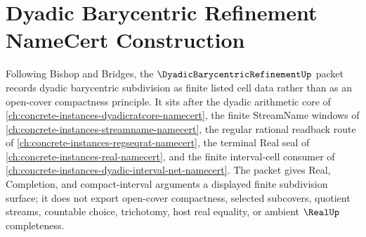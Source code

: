 \chapter{Dyadic Barycentric Refinement NameCert Construction}
\label{ch:concrete-instances-dyadic-barycentric-refinement-namecert}

Following Bishop and Bridges, the $\DyadicBarycentricRefinementUp$ packet records dyadic barycentric subdivision as finite listed cell data rather than as an open-cover compactness principle. It sits after the dyadic arithmetic core of \autoref{ch:concrete-instances-dyadicratcore-namecert}, the finite StreamName windows of \autoref{ch:concrete-instances-streamname-namecert}, the regular rational readback route of \autoref{ch:concrete-instances-regseqrat-namecert}, the terminal Real seal of \autoref{ch:concrete-instances-real-namecert}, and the finite interval-cell consumer of \autoref{ch:concrete-instances-dyadic-interval-net-namecert}. The packet gives Real, Completion, and compact-interval arguments a displayed finite subdivision surface; it does not export open-cover compactness, selected subcovers, quotient streams, countable choice, trichotomy, host real equality, or ambient $\RealUp$ completeness.

